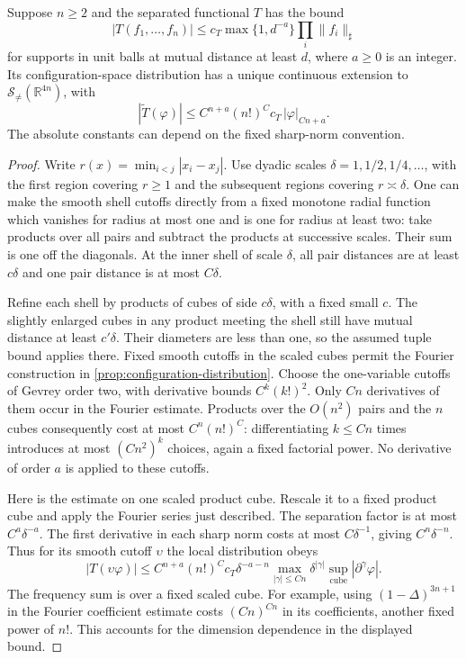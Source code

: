 \documentclass[11pt,letterpaper,reqno]{amsart}
\makeatletter
\theoremstyle{definition}
\newcommand{\ms@minorstart}{%
  \pushQED{\qed}\renewcommand{\qedsymbol}{$\blacksquare$}}
\newenvironment{proposition}[1][]{\ms@minorstart\ms@proposition[#1]}
  {\popQED\endms@proposition}
\theoremstyle{remark}
\newcommand{\R}{\mathbb R}
\newcommand{\cS}{\mathcal S}
\makeatother
\begin{document}
\begin{proposition}[Flat-test extension]\label{prop:flat-test-extension}
Suppose $n\ge2$ and the separated functional $T$ has the bound
\[
 |T(f_1,\ldots,f_n)|
   \le c_T\max\{1,d^{-a}\}\prod_i\|f_i\|_\sharp
\]
for supports in unit balls at mutual distance at least $d$, where
$a\ge0$ is an integer. Its configuration-space distribution has a
unique continuous extension to $\cS_{\ne}(\R^{4n})$, with
\begin{equation}\label{eq:extension}
 |\widetilde T(\varphi)|
       \le C^{n+a}(n!)^Cc_T\,|\varphi|_{Cn+a}.
\end{equation}
The absolute constants can depend on the fixed sharp-norm convention.
\end{proposition}

\begin{proof}
Write $r(x)=\min_{i<j}|x_i-x_j|$. Use dyadic scales
$\delta=1,1/2,1/4,\ldots$, with the first region covering $r\ge1$
and the subsequent regions covering $r\asymp\delta$. One can make
the smooth shell cutoffs directly from a fixed monotone radial function
which vanishes for radius at most one and is one for radius at least
two: take products over all pairs and subtract the products at
successive scales. Their sum is one off the diagonals. At the inner
shell of scale $\delta$, all pair distances are at least $c\delta$
and one pair distance is at most $C\delta$.

Refine each shell by products of cubes of side $c\delta$, with a fixed
small $c$. The slightly enlarged cubes in any product meeting the shell
still have mutual distance at least $c'\delta$. Their diameters are
less than one, so the assumed tuple bound applies there. Fixed smooth
cutoffs in the scaled cubes permit the Fourier construction in
\cref{prop:configuration-distribution}. Choose the one-variable
cutoffs of Gevrey order two, with derivative bounds $C^k(k!)^2$.
Only $Cn$ derivatives of them occur in the Fourier estimate. Products
over the $O(n^2)$ pairs and the $n$ cubes consequently cost at most
$C^n(n!)^C$: differentiating $k\le Cn$ times introduces at most
$(Cn^2)^k$ choices, again a fixed factorial power. No derivative of
order $a$ is applied to these cutoffs.

Here is the estimate on one scaled product cube. Rescale it to a fixed
product cube and apply the Fourier series just described. The
separation factor is at most $C^a\delta^{-a}$. The first derivative
in each sharp norm costs at most $C\delta^{-1}$, giving
$C^n\delta^{-n}$. Thus for its smooth cutoff $\upsilon$ the local
distribution obeys
\[
 |T(\upsilon\varphi)|
  \le C^{n+a}(n!)^Cc_T\delta^{-a-n}
       \max_{|\gamma|\le Cn}
                     \delta^{|\gamma|}\sup_{\mathrm{cube}}
                                        |\partial^\gamma\varphi|.
\]
The frequency sum is over a fixed scaled cube. For example, using
$(1-\Delta)^{3n+1}$ in the Fourier coefficient estimate costs
$(Cn)^{Cn}$ in its coefficients, another fixed power of $n!$.
This accounts for the dimension dependence in the displayed bound.


\end{proof}
\end{document}
